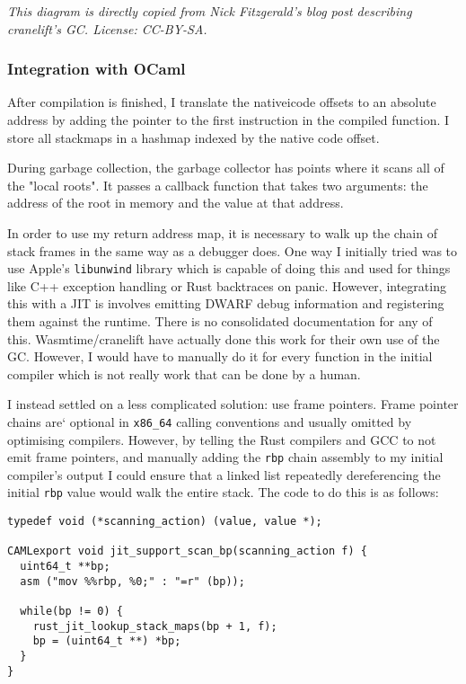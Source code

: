 \noindent\emph{
      This diagram is directly copied from Nick Fitzgerald's blog post \cite{refblog} describing
      cranelift's GC. License: CC-BY-SA.
}

\subsubsection{Integration with OCaml}

After compilation is finished, I translate the nativeicode offsets to an absolute address by adding
the
pointer to the first instruction in the compiled function. I store all stackmaps in a hashmap
indexed by the native code offset.

During garbage collection, the garbage collector has points where it scans all of the "local
roots". It passes a callback function that takes two arguments: the address of the root in
memory
and the value at that address.

In order to use my return address map, it is necessary to walk up the chain of stack frames in the
same way as a debugger does.  One way I initially tried was to use Apple's \texttt{libunwind}
library which is capable of doing this and used for things like C++ exception handling or Rust
backtraces on panic. However, integrating this with a JIT is involves emitting DWARF debug
information and registering them against the runtime. There is no consolidated documentation for
any
of this. Wasmtime/cranelift have actually done this work for their own use of the GC. However, I
would have to manually do it for every function in the initial compiler which is not really
work that can be done by a human.

I instead settled on a less complicated solution: use frame pointers. Frame pointer chains are`
optional in \texttt{x86\_64} calling conventions and usually omitted by optimising compilers.
However, by telling the Rust compilers and GCC to not emit frame pointers, and manually adding the
\texttt{rbp} chain assembly to my initial compiler's output I could ensure that a linked list
repeatedly dereferencing the initial \texttt{rbp} value would walk the entire stack. The code to do
this is as follows:

\begin{verbatim}
typedef void (*scanning_action) (value, value *);

CAMLexport void jit_support_scan_bp(scanning_action f) {
  uint64_t **bp;
  asm ("mov %%rbp, %0;" : "=r" (bp));

  while(bp != 0) {
    rust_jit_lookup_stack_maps(bp + 1, f);
    bp = (uint64_t **) *bp;
  }
}
\end{verbatim}

